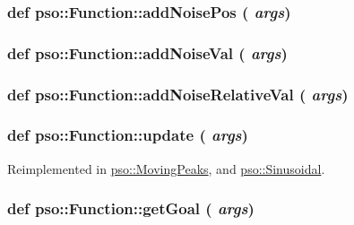 \hypertarget{classpso_1_1Function_b513ffe2a27e5f3ff68f40bd20680825}{
\subsubsection{\setlength{\rightskip}{0pt plus 5cm}def pso::Function::addNoisePos ( {\em args})}}
\label{classpso_1_1Function_b513ffe2a27e5f3ff68f40bd20680825}


\hypertarget{classpso_1_1Function_fe29a56e75f3a076e00fdecbb8d4197d}{
\subsubsection{\setlength{\rightskip}{0pt plus 5cm}def pso::Function::addNoiseVal ( {\em args})}}
\label{classpso_1_1Function_fe29a56e75f3a076e00fdecbb8d4197d}


\hypertarget{classpso_1_1Function_839d1e649623a32eef82be4e64f481ad}{
\subsubsection{\setlength{\rightskip}{0pt plus 5cm}def pso::Function::addNoiseRelativeVal ( {\em args})}}
\label{classpso_1_1Function_839d1e649623a32eef82be4e64f481ad}


\hypertarget{classpso_1_1Function_95ef0ee896d9855495cb2518c368fecf}{
\subsubsection{\setlength{\rightskip}{0pt plus 5cm}def pso::Function::update ( {\em args})}}
\label{classpso_1_1Function_95ef0ee896d9855495cb2518c368fecf}




Reimplemented in \hyperlink{classpso_1_1MovingPeaks_2498bfb3e35cc34ed63f1fcf6c8dbdd6}{pso::MovingPeaks}, and \hyperlink{classpso_1_1Sinusoidal_56ebee67a884bc171cddea452bf12f2e}{pso::Sinusoidal}.\hypertarget{classpso_1_1Function_f9adcf9d0da73d89e6f411f0f0f27d2c}{
\subsubsection{\setlength{\rightskip}{0pt plus 5cm}def pso::Function::getGoal ( {\em args})}}
\label{classpso_1_1Function_f9adcf9d0da73d89e6f411f0f0f27d2c}


